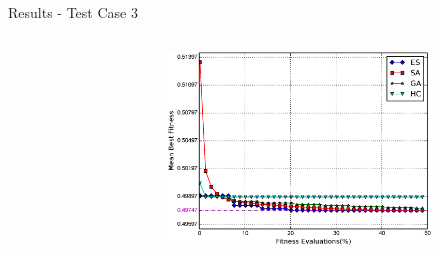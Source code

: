 \documentclass{beamer}
\begin{document}
\begin{frame}{Results - Test Case 3}
\begin{columns}
\begin{column}{.5\columnwidth}
\begin{figure}
\begin{subfigure}{\columnwidth}
                \end{subfigure}\hfill%
            \end{figure}
        \end{column}
        \begin{column}{.6\columnwidth}
            \vspace*{-1cm}
            \begin{figure}
                \begin{subfigure}{\columnwidth}
                    \includegraphics[width=\columnwidth, height=\columnwidth]{../paper/FIG/tc3_mf}%
                \end{subfigure}\hfill\\%
            \end{figure}
        \end{column}
    \end{columns}
\end{frame}
\end{document}
